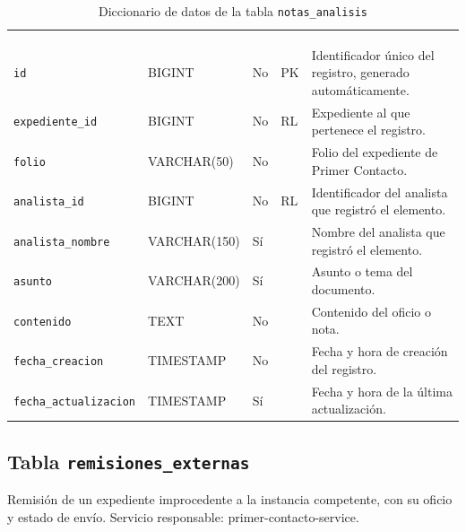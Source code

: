 \footnotesize
\renewcommand{\arraystretch}{1.15}
\setlength{\tabcolsep}{4pt}
\begin{longtable}{|L{3.9cm}|L{2.4cm}|L{0.9cm}|L{1.2cm}|L{6.6cm}|}
	\hiderowcolors\caption{Diccionario de datos de la tabla \texttt{notas\_analisis}}
	\label{tab:dic_notas_analisis} \\ \showrowcolors
	\hline
	 &  &  &  &  \\
	\hline
	\endfirsthead
	\hline
	 &  &  &  &  \\
	\hline
	\endhead
		\texttt{id} & BIGINT & No & PK & Identificador único del registro, generado automáticamente. \\ \hline
		\texttt{expediente\_\allowbreak{}id} & BIGINT & No & RL & Expediente al que pertenece el registro. \\ \hline
		\texttt{folio} & VARCHAR(50) & No &  & Folio del expediente de Primer Contacto. \\ \hline
		\texttt{analista\_\allowbreak{}id} & BIGINT & No & RL & Identificador del analista que registró el elemento. \\ \hline
		\texttt{analista\_\allowbreak{}nombre} & VARCHAR(150) & Sí &  & Nombre del analista que registró el elemento. \\ \hline
		\texttt{asunto} & VARCHAR(200) & Sí &  & Asunto o tema del documento. \\ \hline
		\texttt{contenido} & TEXT & No &  & Contenido del oficio o nota. \\ \hline
		\texttt{fecha\_\allowbreak{}creacion} & TIMESTAMP & No &  & Fecha y hora de creación del registro. \\ \hline
		\texttt{fecha\_\allowbreak{}actualizacion} & TIMESTAMP & Sí &  & Fecha y hora de la última actualización. \\ \hline
\end{longtable}
\normalsize
\setlength{\tabcolsep}{6pt}
\renewcommand{\arraystretch}{1}

\subsection{Tabla \texttt{remisiones\_externas}}
Remisión de un expediente improcedente a la instancia competente, con su oficio y estado de envío. Servicio responsable: primer-contacto-service.


